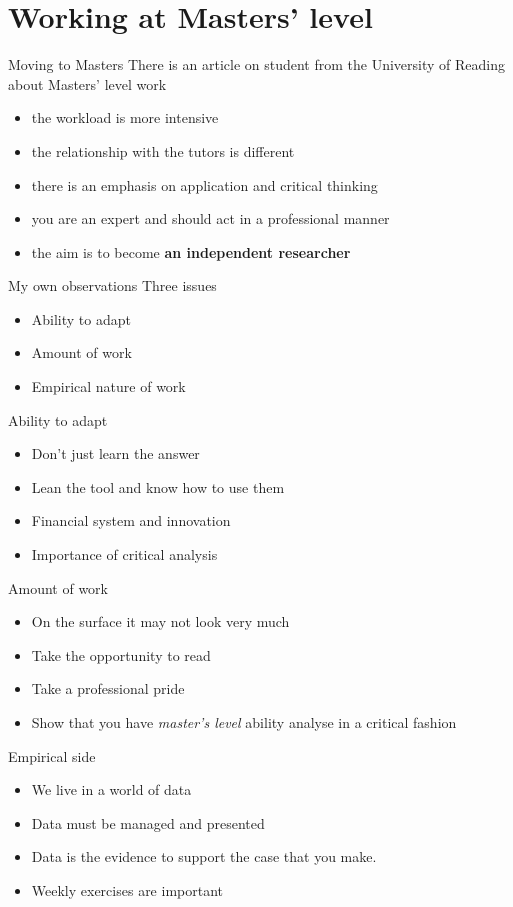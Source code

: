 \documentclass[14pt,xcolor=pdftex,dvipsnames,table]{beamer}\usepackage[]{graphicx}\usepackage[]{color}
\begin{document}
\section{Working at Masters' level}
\begin{frame}{Moving to Masters}
There is an article on student from the University of Reading about Masters' level work
\begin{itemize}[<+-| alert@+>]
\pause
\item the workload is more intensive
\item the relationship with the tutors is different
\item there is an emphasis on application and critical thinking
\item you are an expert and should act in a professional manner
\item the aim is to become \textbf{an independent researcher}
\end{itemize}
\end{frame}

\begin{frame}{My own observations}
Three issues
\begin{itemize}[<+-| alert@+>]
\pause
\item Ability to adapt
\item Amount of work
\item Empirical nature of work
\end{itemize}
\end{frame}


\begin{frame}{Ability to adapt}
\begin{itemize}[<+-| alert@+>]
\item Don't just learn the answer
\item Lean the tool and know how to use them
\item Financial system and innovation
\item Importance of critical analysis
\end{itemize}
\end{frame}

\begin{frame}{Amount of work}
\begin{itemize}[<+-| alert@+>]
\item On the surface it may not look very much
\item Take the opportunity to read
\item Take a professional pride
\item Show that  you have \emph{master's level} ability analyse in a critical fashion
\end{itemize}
\end{frame}

\begin{frame}{Empirical side}
\begin{itemize}[<+-| alert@+>]
\item We live in a world of data
\item Data must be managed and presented
\item Data is the evidence to support the case that you make. 
\item Weekly exercises are important
\end{itemize}
\end{frame}
\end{document}
